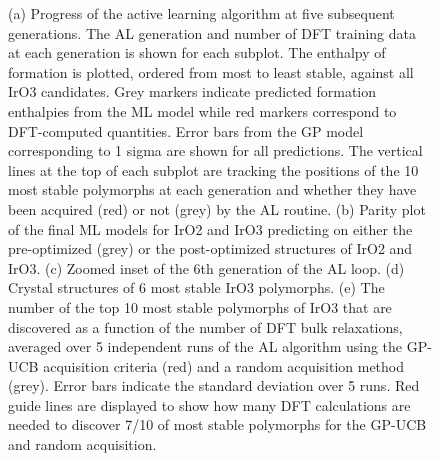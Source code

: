 \begin{figure}[!htb]
\centering
{}
\caption{\label{fig:iro2_al}
(a) Progress of the active learning algorithm at five subsequent generations.
%
The AL generation and number of DFT training data at each generation is shown for each subplot.
%
The enthalpy of formation is plotted, ordered from most to least stable, against all IrO3 candidates.
%
Grey markers indicate predicted formation enthalpies from the ML model while red markers correspond to DFT-computed quantities.
%
Error bars from the GP model corresponding to 1 sigma are shown for all predictions.
%
The vertical lines at the top of each subplot are tracking the positions of the 10 most stable polymorphs at each generation and whether they have been acquired (red) or not (grey) by the AL routine.
(b) Parity plot of the final ML models for IrO2 and IrO3 predicting on either the pre-optimized (grey) or the post-optimized structures of IrO2 and IrO3.
(c) Zoomed inset of the 6th generation of the AL loop.
(d) Crystal structures of 6 most stable IrO3 polymorphs.
(e) The number of the top 10 most stable polymorphs of IrO3 that are discovered as a function of the number of DFT bulk relaxations, averaged over 5 independent runs of the AL algorithm using the GP-UCB acquisition criteria (red) and a random acquisition method (grey).
%
Error bars indicate the standard deviation over 5 runs.
%
Red guide lines are displayed to show how many DFT calculations are needed to discover 7/10 of most stable polymorphs for the GP-UCB and random acquisition.
}
\end{figure}



